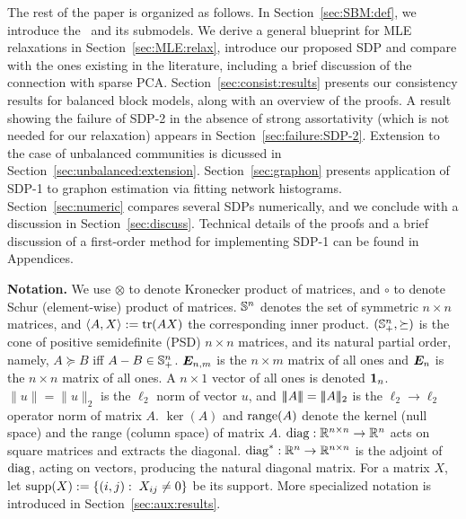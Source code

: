 


The rest of the paper is organized as follows.  In Section~\ref{sec:SBM:def}, we introduce the \SBM\ and its submodels. We derive a general blueprint for MLE relaxations in Section~\ref{sec:MLE:relax}, introduce our proposed SDP and compare with the ones existing in the literature, including a brief discussion of the connection with sparse PCA. Section~\ref{sec:consist:results} presents our consistency results for balanced block models, along with an overview of the proofs. A result showing the failure of SDP-2 in the absence of strong assortativity (which is not needed for our relaxation)  appears in Section~\ref{sec:failure:SDP-2}.  Extension to the case of unbalanced communities is dicussed in Section~\ref{sec:unbalanced:extension}.  Section~\ref{sec:graphon} presents application of SDP-1 to graphon estimation via fitting network histograms. Section~\ref{sec:numeric} compares several SDPs numerically, and we conclude with a discussion in Section~\ref{sec:discuss}. Technical details of the proofs and a brief discussion of a first-order method for implementing SDP-1 can be found in Appendices.



\medskip
\textbf{Notation.} We use $\otimes$ to denote Kronecker product of matrices, and $\circ$ to denote Schur (element-wise) product of matrices.  $\mathbb{S}^{n}$ denotes the set of symmetric $n\times n$ matrices, and $\langle A,X\rangle := \operatorname*{tr}(AX)$ the corresponding inner product.  $(\mathbb{S}^{n}_+,\succeq)$  is the cone of positive semidefinite (PSD) $n\times n$ matrices, and its natural partial order, namely, $A \succeq B$ iff $A-B \in \mathbb{S}^{n}_+$.  $\bm{E}_{n,m}$ is the $n \times m$ matrix of all ones and $\bm{E}_n$ is the $n \times n$ matrix of all ones.   A $n \times 1$ vector of all ones is denoted $\bm{1}_n$.    $\|u\| = \|u\|_2$ is the $\ell_2$ norm of vector $u$, and $\mnorm{A} = \mnorm{A}_2$ is the $\ell_2  \rightarrow \ell_2$ operator norm of matrix $A$.
%
 $\ker(A)$ and $\operatorname{range}(A)$ denote the kernel (null space) and the range (column space) of matrix $A$. $\operatorname{diag}: \mathbb{R}^{n \times n} \to \mathbb{R}^n $ acts on square matrices and extracts the diagonal.  $\operatorname{diag}^*: \mathbb{R}^n \to \mathbb{R}^{n \times n}$ is the adjoint of $\operatorname{diag}$, acting on vectors, producing the natural diagonal matrix. For a matrix $X$, let $\operatorname{supp}(X) := \{(i,j):\; X_{ij} \neq 0\}$ be its support. More specialized notation is introduced in Section~\ref{sec:aux:results}.


